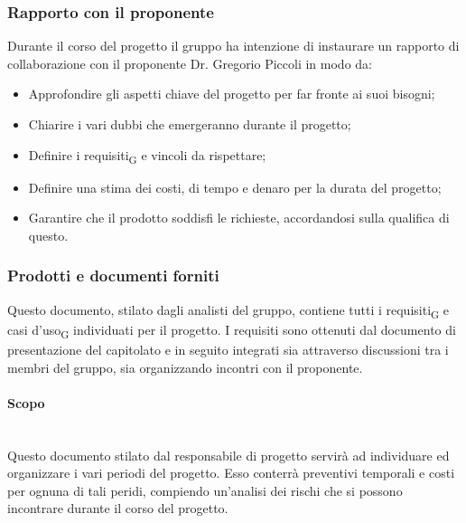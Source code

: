 \subsubsection{Rapporto con il proponente}
Durante il corso del progetto il gruppo ha intenzione di instaurare un rapporto di collaborazione con il proponente Dr. Gregorio Piccoli in modo da:
\begin{itemize}
	\item Approfondire gli aspetti chiave del progetto per far fronte ai suoi bisogni;
	\item Chiarire i vari dubbi che emergeranno durante il progetto;
	\item Definire i requisiti\textsubscript{G} e vincoli da rispettare;
	\item Definire una stima dei costi, di tempo e denaro per la durata del progetto;
	\item Garantire che il prodotto soddisfi le richieste, accordandosi sulla qualifica di questo.
\end{itemize} 

\subsubsection{Prodotti e documenti forniti}
Questo documento, stilato dagli analisti del gruppo, contiene tutti i requisiti\textsubscript{G} e casi d'uso\textsubscript{G} individuati per il progetto. I requisiti sono ottenuti dal documento di presentazione del capitolato e in seguito integrati sia attraverso discussioni tra i membri del gruppo, sia organizzando incontri con il proponente. 
\paragraph {Scopo}\mbox{}\\
Questo documento stilato dal responsabile di progetto servirà ad individuare ed organizzare i vari periodi del progetto. Esso conterrà preventivi temporali e costi per ognuna di tali peridi, compiendo un'analisi dei rischi che si possono incontrare durante il corso del progetto.
